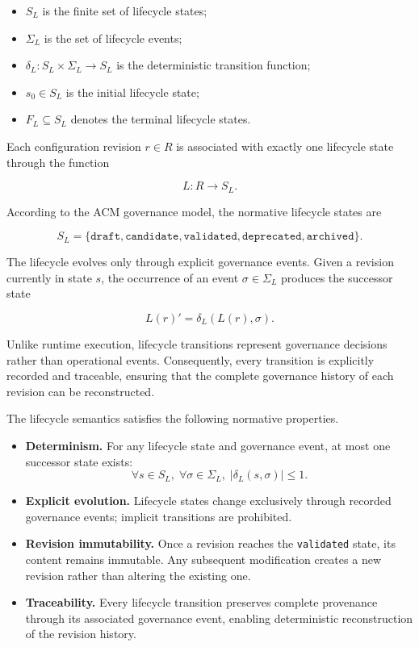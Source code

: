\documentclass[10pt]{article}
\begin{document}
\begin{itemize}
    \item \(S_L\) is the finite set of lifecycle states;
    \item \(\Sigma_L\) is the set of lifecycle events;
    \item \(\delta_L : S_L \times \Sigma_L \rightarrow S_L\) is the deterministic transition function;
    \item \(s_0 \in S_L\) is the initial lifecycle state;
    \item \(F_L \subseteq S_L\) denotes the terminal lifecycle states.
\end{itemize}

Each configuration revision \(r \in R\) is associated with exactly one lifecycle state through the function

\[
L : R \rightarrow S_L.
\]

According to the ACM governance model, the normative lifecycle states are

\[
S_L=
\{
\texttt{draft},
\texttt{candidate},
\texttt{validated},
\texttt{deprecated},
\texttt{archived}
\}.
\]

The lifecycle evolves only through explicit governance events. Given a revision currently in state \(s\), the occurrence of an event
\(\sigma \in \Sigma_L\)
produces the successor state

\[
L(r)'=\delta_L(L(r),\sigma).
\]

Unlike runtime execution, lifecycle transitions represent governance decisions rather than operational events. Consequently, every transition is explicitly recorded and traceable, ensuring that the complete governance history of each revision can be reconstructed.

The lifecycle semantics satisfies the following normative properties.

\begin{itemize}
    \item \textbf{Determinism.} For any lifecycle state and governance event, at most one successor state exists:
    \[
    \forall s\in S_L,\;
    \forall\sigma\in\Sigma_L,\;
    |\delta_L(s,\sigma)|\le1.
    \]

    \item \textbf{Explicit evolution.}
    Lifecycle states change exclusively through recorded governance events; implicit transitions are prohibited.

    \item \textbf{Revision immutability.}
    Once a revision reaches the \texttt{validated} state, its content remains immutable. Any subsequent modification creates a new revision rather than altering the existing one.

    \item \textbf{Traceability.}
    Every lifecycle transition preserves complete provenance through its associated governance event, enabling deterministic reconstruction of the revision history.
\end{itemize}
\end{document}
